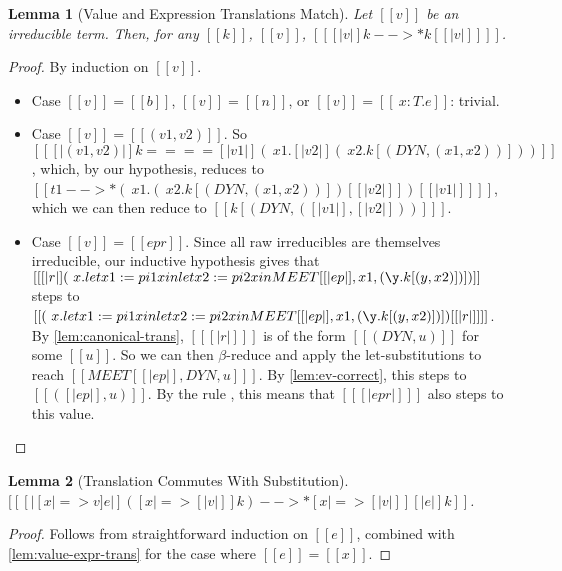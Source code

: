 \documentclass[11pt]{article}
\newtheorem{lemma}{Lemma}[section]
\newcommand{\rrule}[1]{\rref*{#1}}
\begin{document}
\begin{lemma}[Value and Expression Translations Match]
	\label{lem:value-expr-trans}
	Let $[[v]]$ be an irreducible term. Then, for any $[[k]]$, $[[v]]$, $[[ [|v|]k -->* k [ [|v|] ]  ]]$.
\end{lemma}
\begin{proof}
	By induction on $[[v]]$. 

	\begin{itemize}
		\item Case $[[v]] = [[b]]$, $[[v]] = [[n]]$, or $[[v]] = [[\ x : T . e]]$: trivial.
		\item Case $[[v]] = [[(v1, v2)]]$.
		      So $[[ [|(v1, v2)|]k ==== [| v1 |](\ x1 . [|v2|](\ x2 . k[(DYN, (x1, x2))] ) )  ]]$,
		      which, by our hypothesis, reduces to  $[[t1 -->* (\ x1 . (\ x2 . k[(DYN, (x1, x2))] )[ [|v2|] ] )[ [|v1|] ] ]]$,
		      which we can then reduce to $[[k[(DYN, ([|v1|],[|v2|]))] ]]$.
		\item Case $[[v]] = [[ep r]]$. Since all raw irreducibles are themselves irreducible,
		      our inductive hypothesis gives that
		      $[[ [|r|] (\ x . let x1 := pi1 x in let x2 := pi2 x in MEET [ [|ep|],x1, (\y . k [(y,x2)]) ] )]]$
		      steps to $[[(\ x . let x1 := pi1 x in let x2 := pi2 x in MEET [ [|ep|],x1, (\y . k [(y,x2)]) ] )[ [|r|] ] ]]$.
		      By \autoref{lem:canonical-trans}, $[[ [|r|] ]]$ is of the form
		      $[[(DYN, u)]]$ for some $[[u]]$.
		      So we can then $\beta$-reduce and apply the let-substitutions to reach $[[ MEET[ [|ep|], DYN, u ]  ]]$.
		      By \autoref{lem:ev-correct}, this steps to $[[([|ep|], u)]]$.
		      By the rule \rrule{TransformEv}, this means that $[[ [|ep r|] ]]$ also steps to this value.
 

	\end{itemize}
\end{proof}

\begin{lemma}[Translation Commutes With Substitution]
	\label{lem:subst-commut}
	$[[ [|[x |=> v]e|]([x |=> [|v|] ]k) -->* [x |=> [|v|] ][|e|]k   ]]$.   
\end{lemma} 
\begin{proof}
	Follows from straightforward induction on $[[e]]$, combined with \autoref{lem:value-expr-trans}
	for the case where $[[e]]=[[x]]$.
\end{proof}
\end{document}
